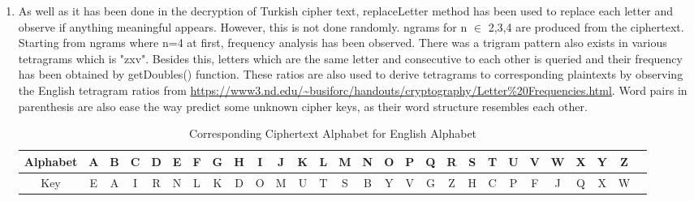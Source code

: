 \documentclass[12pt,a4paper, margin=1in]{article}
\begin{document}
\begin{enumerate}
\begin{enumerate}
            \item
            As well as it has been done in the decryption of Turkish cipher text, replaceLetter method has been used to replace each letter and observe if anything meaningful appears. However, this is not done randomly. ngrams for n $\in$ {2,3,4} are produced from the ciphertext. Starting from ngrams where n=4 at first, frequency analysis has been observed. There was a trigram pattern also exists in various tetragrams which is "zxv". Besides this, letters which are the same letter and consecutive to each other is queried and their frequency has been obtained by getDoubles() function. These ratios are also used to derive tetragrams to corresponding plaintexts by observing the English tetragram ratios from \url{https://www3.nd.edu/~busiforc/handouts/cryptography/Letter\%20Frequencies.html}. Word pairs in parenthesis are also ease the way predict some unknown cipher keys, as their word structure resembles each other.
            \begin{table}[!h]
                \centering
                \begin{tabular}{|c|c|c|c|c|c|c|c|c|c|c|c|c|c|c|c|c|c|c|c|c|c|c|c|c|c|c|c|}
                \hline
                 \tiny Alphabet &  \tiny A & \tiny B & \tiny C & \tiny D & \tiny E & \tiny F & \tiny G & \tiny H & \tiny I & \tiny J & \tiny K & \tiny L & \tiny M & \tiny N & \tiny O & \tiny P \tiny & \tiny Q & \tiny R & \tiny S & \tiny T & \tiny U & \tiny V & \tiny W & \tiny X & \tiny Y & \tiny Z  \\
                 \hline
                 \tiny Key & \tiny E & \tiny A & \tiny I & \tiny R & \tiny N & \tiny L & \tiny K & \tiny D  & \tiny O & \tiny M & \tiny U & \tiny T & \tiny S & \tiny B & \tiny Y & \tiny V & \tiny G & \tiny Z & \tiny H & \tiny C & \tiny P & \tiny F & \tiny J & \tiny Q & \tiny X & \tiny W \\
                 \hline
                \end{tabular}
                \caption{Corresponding Ciphertext Alphabet for English Alphabet}
                \label{tab:engcipher}
            \end{table}


\end{enumerate}
\end{enumerate}
\end{document}
